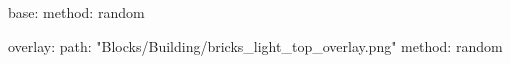 base:
  method: random
  
overlay:
  path: "Blocks/Building/bricks_light_top_overlay.png"
  method: random